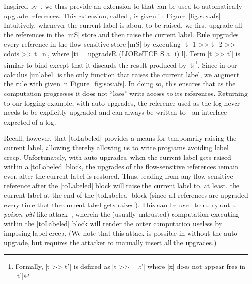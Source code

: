 Inspired by~\citep{Hedin13}, we thus provide an extension to \liofs{} that can
be used to automatically upgrade references.
%
This extension, called \lioafs{}, is given in Figure~\ref{fig:sos:afs}.
%
Intuitively, whenever the current label is about to be raised, we first upgrade
all the references in the |mS| store %
and then raise the current label.
%
Rule  upgrades every reference in the flow-sensitive store
|mS| by executing |t_1 >> t_2 >> cdots >> t_n|, where 
|ti = upgradeR (LIORefTCB S a_i) l|. Term |t >> t'| is
similar to bind except that it discards the result produced by
|t|\footnote{Formally, |t >> t'| is defined as |t >>= \x.t'| where |x| does not
  appear free in |t'|}. 
%
Since in our calculus |unlabel| is the only function that raises the current
label, we augment the  rule with  given in
Figure~\ref{fig:sos:afs}.
%
In doing so, this ensures that as the computation progresses it does not
``lose'' write access to its references.
%
Returning to our logging example, with auto-upgrades, the reference used as the
log never needs to be explicitly upgraded and can always be written to---an
interface expected of a log.

Recall, however, that |toLabeled| provides a means for temporarily raising the
current label, allowing thereby allowing us to write programs avoiding 
label creep.
%
Unfortunately, with auto-upgrades, when the current label gets raised 
within a |toLabeled| block, the upgrades of the flow-sensitive references remain even
after the current label is restored.
%
Thus, reading from any flow-sensitive reference after the |toLabeled|
block will raise the current label to, at least, the current label at the end
of the |toLabeled| block (since all references are upgraded every time that 
the current label gets raised).
%
This can be used to carry out a \emph{poison pill}-like
attack~\cite{10.1109/SP.2013.10}, wherein the (usually untrusted) computation
executing within the |toLabeled| block will render the outer computation useless
by imposing label creep.
%
(We note that this attack is possible in \liofs{} without the auto-upgrade, but
requires the attacker to manually insert all the upgrades.)

